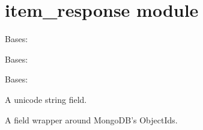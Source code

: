 \documentclass[letterpaper,10pt,english]{sphinxmanual}
\begin{document}
\chapter{item\_response module}
\label{\detokenize{item_response:item-response-module}}\label{\detokenize{item_response::doc}}\label{\detokenize{item_response:module-item_response}}

\begin{fulllineitems}
\label{\detokenize{item_response:item_response.ItemResponse}}
Bases: 

\begin{fulllineitems}
\label{\detokenize{item_response:item_response.ItemResponse.DoesNotExist}}
Bases: 

\end{fulllineitems}


\begin{fulllineitems}
\label{\detokenize{item_response:item_response.ItemResponse.MultipleObjectsReturned}}
Bases: 

\end{fulllineitems}


\begin{fulllineitems}
\label{\detokenize{item_response:item_response.ItemResponse.answer}}
A unicode string field.

\end{fulllineitems}


\begin{fulllineitems}
\label{\detokenize{item_response:item_response.ItemResponse.id}}
A field wrapper around MongoDB's ObjectIds.


\end{fulllineitems}
\end{fulllineitems}
\end{document}
